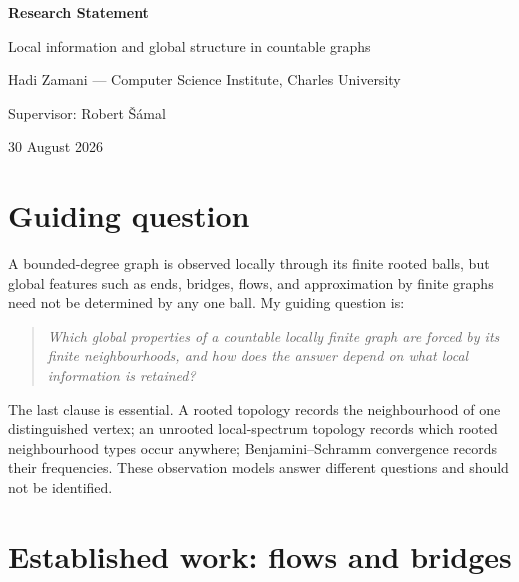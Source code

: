 \documentclass[10pt]{article}
\begin{document}
\begin{center}
{\LARGE\bfseries Research Statement\par}
\vspace{1mm}
{\large Local information and global structure in countable graphs\par}
\vspace{2mm}
{Hadi Zamani --- Computer Science Institute, Charles University\par}
{Supervisor: Robert \v{S}\'amal\par}
{\small 30 August 2026}
\end{center}

\begin{abstract}
My research concerns local-to-global questions in sparse and countable graphs.  My
current joint work with Robert \v{S}\'amal has three concrete parts: extending
nowhere-zero flow theory to countably infinite locally finite graphs, comparing
Baire-category notions of typicality in rooted and unrooted bounded-degree graph
spaces, and proving an undecidability theorem for reconstruction from exact finite
local data.  A further direction is to understand the recent explicit construction of
a nonsofic group and to investigate whether its non-approximability argument has a
direct combinatorial formulation.
\end{abstract}

\section{Guiding question}

A bounded-degree graph is observed locally through its finite rooted balls, but global
features such as ends, bridges, flows, and approximation by finite graphs need not be
determined by any one ball.  My guiding question is:
\begin{quote}
\emph{Which global properties of a countable locally finite graph are forced by its
finite neighbourhoods, and how does the answer depend on what local information is
retained?}
\end{quote}
The last clause is essential.  A rooted topology records the neighbourhood of one
distinguished vertex; an unrooted local-spectrum topology records which rooted
neighbourhood types occur anywhere; Benjamini--Schramm convergence records their
frequencies.  These observation models answer different questions and should not be
identified.

\section{Established work: flows and bridges}
\end{document}
